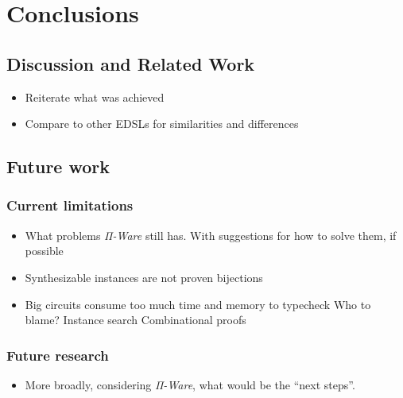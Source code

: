 \chapter{Conclusions}
\label{chap:conclusions}

    \section{Discussion and Related Work}
    \label{sec:related-work}
        \begin{itemize}
            \item Reiterate what was achieved
            \item Compare to other \acp{EDSL} for similarities and differences
        \end{itemize}


    \section{Future work}
    \label{sec:future-work}

        \subsection{Current limitations}
        \label{subsec:current-limitations}
            \begin{itemize}
                \item What problems \emph{Π-Ware} still has.
                    \subitem With suggestions for how to solve them, if possible
                \item Synthesizable instances are not proven bijections
                \item Big circuits consume too much time and memory to typecheck
                    \subitem Who to blame?
                    \subitem Instance search
                    \subitem Combinational proofs
            \end{itemize}

        \subsection{Future research}
        \label{subsec:future-research}
            \begin{itemize}
                \item More broadly, considering \emph{Π-Ware}, what would be the ``next steps''.
            \end{itemize}

